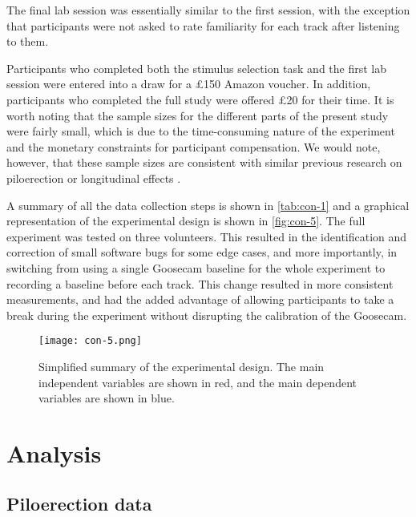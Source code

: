 The final lab session was essentially similar to the first session, with the exception that participants were not asked to rate familiarity for each track after listening to them.

Participants who completed both the stimulus selection task and the first lab session were entered into a draw for a \pounds150 Amazon voucher. In addition, participants who completed the full study were offered \pounds20 for their time. It is worth noting that the sample sizes for the different parts of the present study were fairly small, which is due to the time-consuming nature of the experiment and the monetary constraints for participant compensation. We would note, however, that these sample sizes are consistent with similar previous research on piloerection or longitudinal effects \parencite[e.g.,][]{bannister2018,madison2017,wassiliwizky2017a}.

A summary of all the data collection steps is shown in \autoref{tab:con-1} and a graphical representation of the experimental design is shown in \autoref{fig:con-5}. The full experiment was tested on three volunteers. This resulted in the identification and correction of small software bugs for some edge cases, and more importantly, in switching from using a single Goosecam baseline for the whole experiment to recording a baseline before each track. This change resulted in more consistent measurements, and had the added advantage of allowing participants to take a break during the experiment without disrupting the calibration of the Goosecam.



\begin{figure}[b!]
\texttt{[image: con-5.png]}
\centering
\caption{Simplified summary of the experimental design. The main independent variables are shown in red, and the main dependent variables are shown in blue.}
\label{fig:con-5}
\end{figure}

\section{Analysis}

\subsection{Piloerection data}

